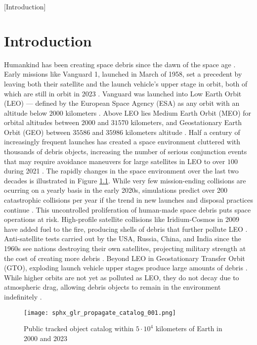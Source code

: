 [Introduction]
\graphicspath{{/Users/liamrobinson/Documents/PyLightCurves/docs/build/html/_images}}

\chapter{Introduction}

Humankind has been creating space debris since the dawn of the space age \cite{esareport2022}. Early missions like Vanguard 1, launched in March of 1958, set a precedent by leaving both their satellite and the launch vehicle's upper stage in orbit, both of which are still in orbit in 2023 \cite{vanguard1}. Vanguard was launched into Low Earth Orbit (LEO) --- defined by the European Space Agency (ESA) as any orbit with an altitude below $2000$ kilometers \cite{esareport2022}. Above LEO lies Medium Earth Orbit (MEO) for orbital altitudes between $2000$ and $31570$ kilometers, and Geostationary Earth Orbit (GEO) between $35586$ and $35986$ kilometers altitude \cite{esareport2022}. Half a century of increasingly frequent launches has created a space environment cluttered with thousands of debris objects, increasing the number of serious conjunction events that may require avoidance maneuvers for large satellites in LEO to over $100$ during 2021 \cite{esareport2022}. The rapidly changes in the space environment over the last two decades is illustrated in Figure \ref{fig:catalog_comparison}. While very few mission-ending collisions are ocurring on a yearly basis in the early 2020s, simulations predict over 200 catastrophic collisions per year if the trend in new launches and disposal practices continue \cite{esareport2022}. This uncontrolled proliferation of human-made space debris puts space operations at risk. High-profile satellite collisions like Iridium-Cosmos in 2009 have added fuel to the fire, producing shells of debris that further pollute LEO \cite{vallado4ed}. Anti-satellite tests carried out by the USA, Russia, China, and India since the 1960s see nations destroying their own satellites, projecting military strength at the cost of creating more debris \cite{vallado4ed}. Beyond LEO in Geostationary Transfer Orbit (GTO), exploding launch vehicle upper stages produce large amounts of debris \cite{esareport2022}. While higher orbits are not yet as polluted as LEO, they do not decay due to atmospheric drag, allowing debris objects to remain in the environment indefinitely \cite{vallado4ed}.

\begin{figure}[ht]
    \centering
    \texttt{[image: sphx\_glr\_propagate\_catalog\_001.png]}
    \caption{Public tracked object catalog within $5 \cdot 10^4$ kilometers of Earth in 2000 and 2023}
    \label{fig:catalog_comparison}
\end{figure}

